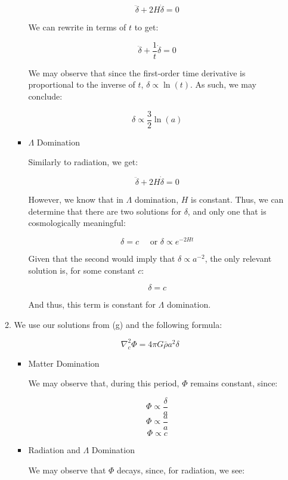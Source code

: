 \begin{enumerate}
\begin{enumerate}
\begin{itemize}
            $$\ddot{\delta}+2H\dot{\delta}=0$$

            We can rewrite in terms of $t$ to get:

            $$\ddot{\delta}+\frac{1}{t}\dot{\delta}=0$$

            We may observe that since the first-order time derivative is proportional to the inverse of $t$, $\delta\propto\ln(t)$. As such, we may conclude:

            $$\boxed{\delta\propto\frac{3}{2}\ln(a)}$$

          \item $\Lambda$ Domination

            Similarly to radiation, we get:

            $$\ddot{\delta}+2H\dot{\delta}=0$$

            However, we know that in $\Lambda$ domination, $H$ is constant. Thus, we can determine that there are two solutions for $\delta$, and only one that is cosmologically meaningful:

            $$\delta = c\quad\text{ or }\delta\propto e^{-2Ht}$$

            Given that the second would imply that $\delta\propto a^{-2}$, the only relevant solution is, for some constant $c$:

            $$\boxed{\delta=c}$$

            And thus, this term is constant for $\Lambda$ domination.

        \end{itemize}

      \item We use our solutions from (g) and the following formula:

        $$\nabla^2_c\Phi=4\pi G\bar{\rho}a^2\delta$$

        \begin{itemize}

          \item Matter Domination

            We may observe that, during this period, $\Phi$ remains constant, since:

            $$\Phi\propto \frac{\delta}{a}$$
            $$\Phi\propto \frac{a}{a}$$
            $$\boxed{\Phi\propto c}$$

          \item Radiation and $\Lambda$ Domination

            We may observe that $\Phi$ decays, since, for radiation, we see:


\end{itemize}
\end{enumerate}
\end{enumerate}
